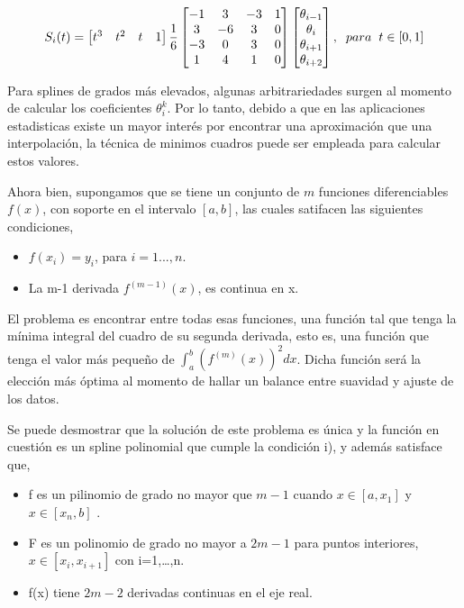 \documentclass[
  12pt,
]{krantz}
\providecommand{\tightlist}{%
  \setlength{\itemsep}{0pt}\setlength{\parskip}{0pt}}
\begin{document}
\[\displaystyle{S_{i}(t) = \begin{bmatrix} t^3  & t^2 & t & 1  \end{bmatrix} \frac{1}{6} \begin{bmatrix} -1 & 3 & -3 & 1 \\ 3 & -6 & 3 & 0 \\ -3 & 0 & 3 & 0 \\ 1 & 4 & 1 & 0 \end{bmatrix} \begin{bmatrix}  \theta_{i-1} \\ \theta_{i} \\ \theta_{i+1} \\ \theta_{i+2}  \end{bmatrix} , \hspace{0.2cm} para \hspace{0.2cm} t \in [0,1] }\]

Para splines de grados más elevados, algunas arbitrariedades surgen al momento de calcular los coeficientes \(\theta_{i}^{k}\). Por lo tanto, debido a que en las aplicaciones estadisticas existe un mayor interés por encontrar una aproximación que una interpolación, la técnica de minimos cuadros puede ser empleada para calcular estos valores.

Ahora bien, supongamos que se tiene un conjunto de \(m\) funciones diferenciables \(f(x)\), con soporte en el intervalo \([a,b]\), las cuales satifacen las siguientes condiciones,

\begin{itemize}
\tightlist
\item
  \(f(x_{i})=y_{i}\), para \(i=1...,n\).
\item
  La m-1 derivada \(f^{(m-1)}(x)\), es continua en x.
\end{itemize}

El problema es encontrar entre todas esas funciones, una función tal que tenga la mínima integral del cuadro de su segunda derivada, esto es, una función que tenga el valor más pequeño de \(\int_{a}^{b} (f^{(m)}(x))^2 dx\). Dicha función será la elección más óptima al momento de hallar un balance entre suavidad y ajuste de los datos.

Se puede desmostrar que la solución de este problema es única y la función en cuestión es un spline polinomial que cumple la condición i), y además satisface que,

\begin{itemize}
\tightlist
\item
  f es un pilinomio de grado no mayor que \(m-1\) cuando \(x \in [a,x_{1}]\) y \(x \in [x_{n},b]\) .
\item
  F es un polinomio de grado no mayor a \(2m-1\) para puntos interiores, \(x \in [x_{i},x_{i+1}]\) con i=1,\ldots,n.
\item
  f(x) tiene \(2m-2\) derivadas continuas en el eje real.
\end{itemize}
\end{document}

